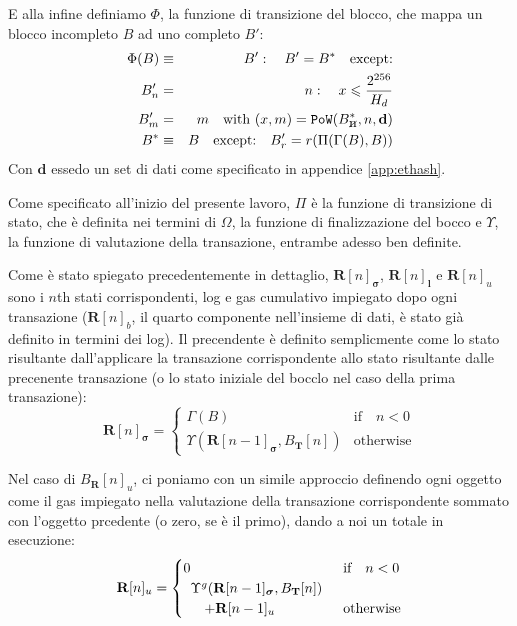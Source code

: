 \documentclass[9pt,oneside]{amsart}
\newcommand{\hcancel}[1]{%
    \tikz[baseline=(tocancel.base)]{
        \node[inner sep=0pt,outer sep=0pt] (tocancel) {#1};
        \draw[black] (tocancel.south west) -- (tocancel.north east);
    }%
}%
\begin{document}
\begin{multicols}{2}
E alla infine definiamo $\Phi$, la funzione di transizione del blocco, che mappa un blocco incompleto $B$ ad uno completo $B'$:
\begin{eqnarray}
\Phi(B) & \equiv & B': \quad B' = B^* \quad \text{except:} \\
B'_n & = & n: \quad x \leqslant \frac{2^{256}}{H_d} \\
B'_m & = & m \quad \text{with } (x, m) = \mathtt{PoW}(B^*_{\hcancel{n}}, n, \mathbf{d}) \\
B^* & \equiv & B \quad \text{except:} \quad B'_r = r(\Pi(\Gamma(B), B))
\end{eqnarray}
Con $\mathbf{d}$ essedo un set di dati come specificato in appendice \ref{app:ethash}.

Come specificato all'inizio del presente lavoro, $\Pi$ è la funzione di transizione di stato, che è definita nei termini di $\Omega$, la funzione di finalizzazione del bocco e $\Upsilon$, la funzione di valutazione della transazione, entrambe adesso ben definite.

Come è stato spiegato precedentemente in dettaglio, $\mathbf{R}[n]_{\boldsymbol{\sigma}}$, $\mathbf{R}[n]_\mathbf{l}$ e $\mathbf{R}[n]_u$ sono i $n$th stati corrispondenti, log e gas cumulativo impiegato dopo ogni transazione ($\mathbf{R}[n]_b$, il quarto componente nell'insieme di dati, è stato già definito in termini dei log). Il precendente è definito semplicmente come lo stato risultante dall'applicare la transazione corrispondente allo stato risultante dalle precenente transazione (o lo stato iniziale del bocclo nel caso della prima transazione):
\begin{equation}
\mathbf{R}[n]_{\boldsymbol{\sigma}} = \begin{cases} \Gamma(B) & \text{if} \quad n < 0 \\ \Upsilon(\mathbf{R}[n - 1]_{\boldsymbol{\sigma}}, B_\mathbf{T}[n]) & \text{otherwise} \end{cases}
\end{equation}

Nel caso di  $B_\mathbf{R}[n]_u$, ci poniamo con un simile approccio definendo ogni oggetto come il gas impiegato nella valutazione della transazione corrispondente sommato con l'oggetto prcedente (o zero, se è il primo), dando a noi un totale in esecuzione:
\begin{equation}
\mathbf{R}[n]_u = \begin{cases} 0 & \text{if} \quad n < 0 \\
\begin{array}[b]{l}
\Upsilon^g(\mathbf{R}[n - 1]_{\boldsymbol{\sigma}}, B_\mathbf{T}[n])\\ \quad + \mathbf{R}[n-1]_u
\end{array}
 & \text{otherwise} \end{cases}
\end{equation}


\end{multicols}
\end{document}
